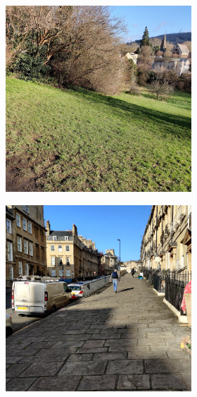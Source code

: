 \begin{figure}[!hbtp]
      \begin{subfigure}[b]{\textwidth}
         \centering
         \begin{subfigure}[b]{0.32\textwidth}
             \centering
             \includegraphics[width=\textwidth]{content/3-Methods/enviroments/ramp_1_modified.jpg}
        \end{subfigure}
        \hfill
         \begin{subfigure}[b]{0.32\textwidth}
             \centering
             \includegraphics[width=\textwidth]{content/3-Methods/enviroments/ramp_2_modified.jpg}

\end{subfigure}
\end{subfigure}
\end{figure}
